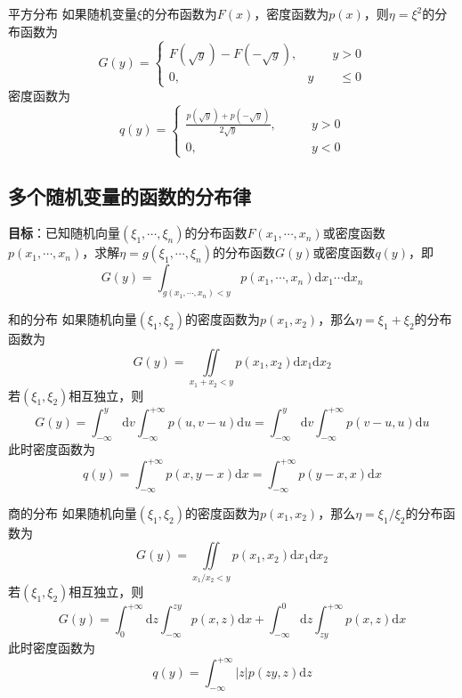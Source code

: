 \documentclass[lang = cn, scheme = chinese, thmcnt = section]{elegantbook}
\newcommand{\dd}{\mathrm{d}}           %
\begin{document}
\begin{proposition}{平方分布}
	如果随机变量$\xi$的分布函数为$F(x)$，密度函数为$p(x)$，则$\eta=\xi^2$的分布函数为
	$$
	G(y)=\begin{cases}
		F(\sqrt{y})-F(-\sqrt{y}),&\qquad y>0\\
		0,&y\qquad \le 0
	\end{cases}
	$$
	密度函数为
	$$
	q(y)=\begin{cases}
		\frac{p(\sqrt{y})+p(-\sqrt{y})}{2\sqrt{y}},&\qquad y>0\\
		0,&\qquad y<0
	\end{cases}
	$$
\end{proposition}

\subsection{多个随机变量的函数的分布律}

\textbf{目标}：已知随机向量$(\xi_1,\cdots,\xi_n)$的分布函数$F(x_1,\cdots,x_n)$或密度函数$p(x_1,\cdots,x_n)$，求解$\eta=g(\xi_1,\cdots,\xi_n)$的分布函数$G(y)$或密度函数$q(y)$，即
$$
G(y)=\int_{g(x_1,\cdots,x_n)<y}p(x_1,\cdots,x_n)\dd x_1\cdots \dd x_n
$$

\begin{proposition}{和的分布}
	如果随机向量$(\xi_1,\xi_2)$的密度函数为$p(x_1,x_2)$，那么$\eta=\xi_1+\xi_2$的分布函数为%
	$$
	G(y) = \iint\limits_{x_1+x_2< y}p(x_1,x_2)\dd x_1\dd x_2
	$$
	若$(\xi_1,\xi_2)$相互独立，则%
	$$
	G(y)
	=\int_{-\infty}^{y}\dd v\int_{-\infty}^{+\infty}p(u,v-u)\dd u
	=\int_{-\infty}^{y}\dd v\int_{-\infty}^{+\infty}p(v-u,u)\dd u
	$$
	此时密度函数为%
	$$
	q(y)=\int_{-\infty}^{+\infty}p(x,y-x)\dd x
	=\int_{-\infty}^{+\infty}p(y-x,x)\dd x
	$$
\end{proposition}

\begin{proposition}{商的分布}
	如果随机向量$(\xi_1,\xi_2)$的密度函数为$p(x_1,x_2)$，那么$\eta=\xi_1/\xi_2$的分布函数为%
	$$
	G(y) = \iint\limits_{x_1/x_2< y}p(x_1,x_2)\dd x_1\dd x_2
	$$
	若$(\xi_1,\xi_2)$相互独立，则%
	$$
	G(y)=\int_{0}^{+\infty}\mathrm{d}z\int_{-\infty}^{zy}{p(x,z)\mathrm{d}x}
	+\int_{-\infty}^{0}\mathrm{d}z\int_{zy}^{+\infty}{p(x,z)\mathrm{d}x}
	$$
	此时密度函数为%
	$$
	q(y)=\int_{-\infty}^{+\infty}{|z|p(zy,z)\mathrm{d}z}
	$$
\end{proposition}
\end{document}
